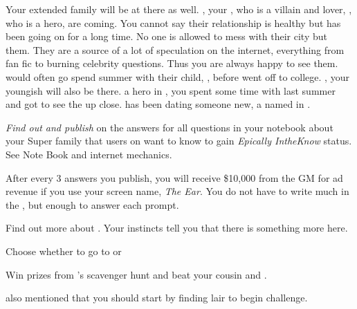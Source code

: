 \documentclass[char]{LRSguildcamp1}
\begin{document}
Your extended family will be at there as well. \cOldest{}, your \cOldest{\uncle}, who is a villain and \cOldest{\their} lover, \cOS{}, who is a hero, are coming. You cannot say their relationship is healthy but has been going on for a long time. No one is allowed to mess with their city but them. They are a source of a lot of speculation on the internet, everything from fan fic to burning celebrity questions. Thus you are always happy to see them. \cTeen{} would often go spend summer with their child, \cGrad{}, before \cGrad{\they} went off to college.  \cYoungest{}, your youngish \cYoungest{\uncle} will also be there. \cYoungest{\Theyare} a hero in \pCityYoungest{}, you spent some time with \cYoungest{\them} last summer and got to see the \cHeroLeague{\intro} up close.  \cYoungest{} has been dating someone new, a \cAS{\hero} named \cAS{} in \pCityYoungest{}. 


\begin{itemz}[Goals]
	\item \textit{Find out and publish} on \pTweenwebsite{} the answers for all questions in your notebook about your Super family that users on \pTweenwebsite{} want to know to gain \textit{Epically IntheKnow} status. See Note Book and internet mechanics.	
	
After every 3 answers you publish, you will receive \$10,000 from the GM for ad revenue if you use your \pTweenwebsite{} screen name, \textit{The Ear}. You do not have to write much in the \wPressRelease{}, but enough to answer each prompt.
	
	\item Find out more about \cAS{}. Your instincts tell you that there is something more here.
	
	\item Choose whether to go to \pSuperSchool{} or \pNormalSchool{}
	
	\item Win prizes from \cGrandma{}'s scavenger hunt and beat your cousin and \cTeen{\sibling}.
\end{itemz}

\begin{itemz}[Notes]
	\item \cGrandma{} also mentioned that you should start by finding \cGrandma{\their} lair to begin \cGrandma{\their} challenge. 
\end{itemz}
\end{document}
